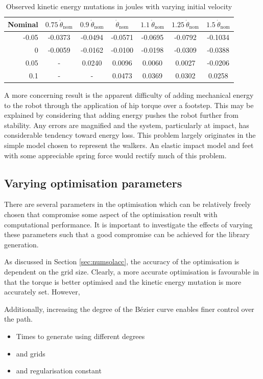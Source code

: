 \begin{table}
	\centering
	\begin{tabular}{ r || c | c | c | c | c | c}
		Nominal & $0.75~\dot{\theta}_{\mathrm{nom}}$ & $0.9~\dot{\theta}_{\mathrm{nom}}$ & $\dot{\theta}_{\mathrm{nom}}$ & $1.1~\dot{\theta}_{\mathrm{nom}}$ & $1.25~\dot{\theta}_{\mathrm{nom}}$ & $1.5~\dot{\theta}_{\mathrm{nom}}$ \\ \hline
		-0.05 & -0.0373 & -0.0494 & -0.0571 & -0.0695 & -0.0792 & -0.1034  \\
		0     & -0.0059 & -0.0162 & -0.0100 & -0.0198 & -0.0309 & -0.0388 \\
		0.05  &    -    &  0.0240 &  0.0096 &  0.0060 &  0.0027 & -0.0206  \\
		0.1   &    -    &    -    &  0.0473 &  0.0369 &  0.0302 &  0.0258
	\end{tabular}
	\caption[Observed kinetic energy mutations with varying initial velocity]{Observed kinetic energy mutations in joules with varying initial velocity}
	\label{tab:vcenergy}
\end{table}

A more concerning result is the apparent difficulty of adding mechanical energy to the robot through the application of hip torque over a footstep. This may be explained by considering that adding energy pushes the robot further from stability. Any errors are magnified and the system, particularly at impact, has considerable tendency toward energy loss. This problem largely originates in the simple model chosen to represent the walkers. An elastic impact model and feet with some appreciable spring force would rectify much of this problem.

\subsection{Varying optimisation parameters}
There are several parameters in the optimisation which can be relatively freely chosen that compromise some aspect of the optimisation result with computational performance. It is important to investigate the effects of varying these parameters such that a good compromise can be achieved for the library generation.

As discussed in Section \ref{sec:numsolacc}, the accuracy of the optimisation is dependent on the grid size. Clearly, a more accurate optimisation is favourable in that the torque is better optimised and the kinetic energy mutation is more accurately set. However,

Additionally, increasing the degree of the Bézier curve enables finer control over the path.

\begin{itemize}
	\item Times to generate using different degrees
	\item and grids
	\item and regularisation constant
\end{itemize}